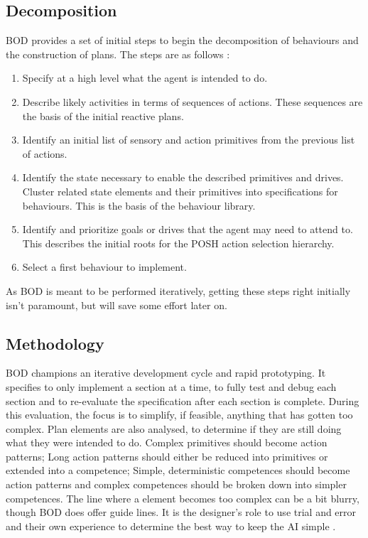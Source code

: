 \documentclass[11pt,openright,a4paper]{report}
\begin{document}
\subsection{Decomposition}
BOD provides a set of initial steps to begin the decomposition of behaviours and the construction of plans. The steps are as follows \cite{bryson2003behavior}:
\begin{enumerate}
\item Specify at a high level what the agent is intended to do.
\item Describe likely activities in terms of sequences of actions. These sequences are the basis of the initial reactive plans.
\item Identify an initial list of sensory and action primitives from the previous list of actions.
\item Identify the state necessary to enable the described primitives and drives. Cluster related state elements and their primitives into specifications for behaviours. This is the basis of the behaviour library.
\item Identify and prioritize goals or drives that the agent may need to attend to. This describes the initial roots for the POSH action selection hierarchy.
\item Select a first behaviour to implement.
\end{enumerate}
As BOD is meant to be performed iteratively, getting these steps right initially isn't paramount, but will save some effort later on.

\subsection{Methodology}
BOD champions an iterative development cycle and rapid prototyping. It specifies to only implement a section at a time, to fully test and debug each section and to re-evaluate the specification after each section is complete. During this evaluation, the focus is to simplify, if feasible, anything that has gotten too complex. Plan elements are also analysed, to determine if they are still doing what they were intended to do. Complex primitives should become action patterns; Long action patterns should either be reduced into primitives or extended into a competence; Simple, deterministic competences should become action patterns and complex competences should be broken down into simpler competences. The line where a element becomes too complex can be a bit blurry, though BOD does offer guide lines. It is the designer's role to use trial and error and their own experience to determine the best way to keep the AI simple \cite{BODWeb}.
\end{document}
